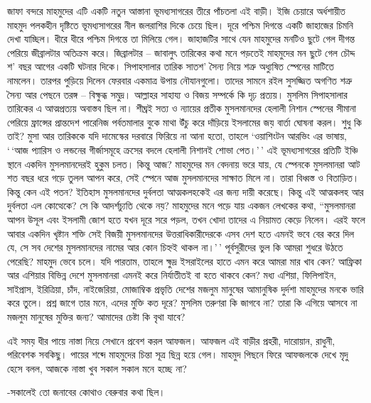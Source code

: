 \documentclass[
]{book}
\begin{document}
জাফা বন্দরে মাহমুদের এটি একটি নতুন আস্তানা ভূমধ্যসাগরের তীরে পাঁচতলা এই বাড়ী। ইজি চেয়ারে অর্ধশায়ীত মাহমুদ পলকহীন দৃষ্টিতে ভূমধ্যসাগরের নীল জলরাশির দিকে চেয়ে ছিল। দূরে পশ্চিম দিগন্তে একটি জাহাজের চিমনি দেখা যাচ্ছিল। ধীরে ধীরে পশ্চিম দিগন্তে তা মিলিয়ে গেল। জাহাজটির সাথে যেন মাহমুদের মনটিও ছুটে গেল দীগন্ত পেরিয়ে জীব্রালটার অতিক্রম করে। জিব্রালটার -- জাবালুৎ তারিকের কথা মনে পড়তেই মাহমুদের মন ছুটে গেল চৌদ্দ শ' বছর আগের একটি ঘটনার দিকে। সিপাহসালার তারিক সাতশ' সৈন্য নিয়ে শত্রু অধ্যুষিত স্পেনের মাটিতে নামলেন। তারপর পুড়িয়ে দিলেন ফেরবার একমাত্র উপায় নৌযানগুলো। তাদের সামনে রইল সুসজ্জিত অগণিত শত্রু সৈন্য আর পেছনে তরঙ্গ -- বিক্ষুব্ধ সমুদ্র। আল্লাহর সাহায্য ও বিজয় সম্পর্কে কি দৃঢ় প্রত্যয়। মুসলিম সিপাহসালার তারিকের এ আত্মপ্রত্যয় অবাস্তব ছিল না। শীঘ্রই সত্য ও ন্যায়ের প্রতীক মুসলমানদের হেলালী নিশান স্পেনের সীমানা পেরিয়ে ফ্রান্সের প্রান্তদেশ পারেনিজ পর্বতমালার বুকে মাথা উঁচু করে দাঁড়িয়ে ইসলামের জয় বার্তা ঘোষনা করল। শুধু কি তাই? মুসা আর তারিককে যদি দামেস্কের দরবারে ফিরিয়ে না আনা হতো, তাহলে `ওয়াশিংটন আরভিং এর ভাষায়, `\,`আজ প্যারিস ও লন্ডনের গীর্জাসমূহে ক্রসের বদলে হেলালী নিশানই শোভা পেত।'\,' এই ভূমধ্যসাগরের প্রতিটি ইঞ্চি স্থানে একদিন মুসলমানদেরই হুকুম চলত। কিন্তু আজ? মাহমুদের মন বেদনায় ভরে যায়, যে স্পেনকে মুসলমানরা আট শত বছর ধরে গড়ে তুলল আপন করে, সেই স্পেনে আজ মুসলমানদের সাক্ষাত মিলে না। তারা বিধ্বস্ত ও বিতাড়িত। কিন্তু কেন এই পতন? ইতিহাস মুসলমানদের দুর্বলতা আত্মকলহকেই এর জন্য দায়ী করেছে। কিন্তু এই আত্মকলহ আর দুর্বলতা এল কোত্থেকে? সে কি আদর্শচ্যুতি থেকে নয়? মাহমুদের মনে পড়ে যায় একজন লেখকের কথা, ``মুসলমানরা আপন উসূল এবং ইসলামী জোশ হতে যখন দূরে সরে পড়ল, তখন খোদা তাদের এ নিয়ামত কেড়ে নিলেন। এরই ফলে আবার একদিন খৃষ্টান শক্তি সেই বিজয়ী মুসলমানদের উত্তরাধিকারীদেরকে এসব দেশ হতে এমনই ভবে বের করে দিল যে, সে সব দেশের মুসলমানদের নামের আর কোন চিহ্নই থাকল না।'\,' পূর্বসুরীদের ভুল কি আমরা শুধরে উঠতে পেরেছি? মাহমুদ ভেবে চলে। যদি পারতাম, তাহলে ক্ষুদ্র ইসরাইলের হাতে এমন করে আমরা মার খাব কেন? আফ্রিকা আর এশিয়ার বিভিন্ন দেশে মুসলমানরা এমনই করে নির্যাতীতই বা হতে থাকবে কেন? মধ্য এশিয়া, ফিলিপাইন, সাইপ্রাস, ইরিত্রিয়া, চাঁদ, নাইজেরিয়া, মোজাম্বিক প্রভৃতি দেশের মজলুম মানুষের আমানুষিক দুর্দশা মাহমুদের মনকে ভারি করে তুলে। প্রশ্ন জাগে তার মনে, এদের মুক্তি কত দূরে? মুসলিম তরুণরা কি জাগবে না? তারা কি এগিয়ে আসবে না মজলুম মানুষের মুক্তির জন্য? আমাদের চেষ্টা কি বৃথা যাবে?

এই সময় ধীর পায়ে নাস্তা নিয়ে সেখানে প্রবেশ করল আফজল। আফজল এই বাড়ীর প্রহরী, দারোয়ান, রাধুনী, পরিবেশক সবকিছু। পায়ের শব্দে মাহমুদের চিন্তা সূত্র ছিন্ন হয়ে গেল। মাহমুদ পিছনে ফিরে আফজলকে দেখে মৃদু হেসে বলল, আজকে নাস্তা খুব সকাল সকাল মনে হচ্ছে না?

-সকালেই তো জনাবের কোথাও বেরুবার কথা ছিল।
\end{document}
